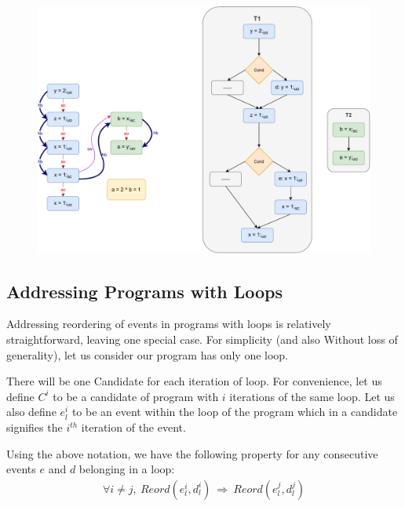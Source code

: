            \begin{figure}
                \centering 
                \includegraphics[scale=0.7]{InstructionReordering/CounterExamples3b(Conditionals).pdf}
                \caption{}
            \end{figure}
    
    \subsection{Addressing Programs with Loops}
        
        Addressing reordering of events in programs with loops is relatively straightforward, leaving one special case. 
        For simplicity (and also Without loss of generality), let us consider our program has only one loop.

        There will be one Candidate for each iteration of loop. For convenience, let us define $C^i$ to be a candidate of program with $i$ iterations of the same loop. Let us also define $e_l^i$ to be an event within the loop of the program which in a candidate signifies the $i^{th}$ iteration of the event. 

        Using the above notation, we have the following property for any consecutive events $e$ and $d$ belonging in a loop:
        \begin{align*}
            \forall i \neq j, \ Reord(e_l^i, d_l^i) \ \Rightarrow \ Reord(e_l^j, d_l^j)
        \end{align*}


